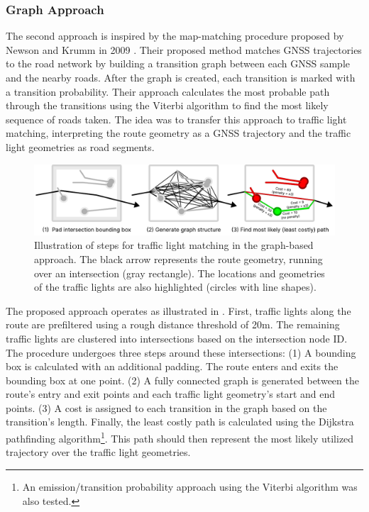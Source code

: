 \subsubsection{Graph Approach}

The second approach is inspired by the map-matching procedure proposed by Newson and Krumm in 2009 \cite{newson_hidden_2009}. Their proposed method matches GNSS trajectories to the road network by building a transition graph between each GNSS sample and the nearby roads. After the graph is created, each transition is marked with a transition probability. Their approach calculates the most probable path through the transitions using the Viterbi algorithm to find the most likely sequence of roads taken. The idea was to transfer this approach to traffic light matching, interpreting the route geometry as a GNSS trajectory and the traffic light geometries as road segments.

\begin{figure}[t]
\centering
\includegraphics[width=\linewidth]{images/sg-selection-graph-approach.pdf}
\caption{Illustration of steps for traffic light matching in the graph-based approach. The black arrow represents the route geometry, running over an intersection (gray rectangle). The locations and geometries of the traffic lights are also highlighted (circles with line shapes).}
\label{fig:sg-selection-graph-approach}
\end{figure}

The proposed approach operates as illustrated in . First, traffic lights along the route are prefiltered using a rough distance threshold of 20m. The remaining traffic lights are clustered into intersections based on the intersection node ID. The procedure undergoes three steps around these intersections: (1) A bounding box is calculated with an additional padding. The route enters and exits the bounding box at one point. (2) A fully connected graph is generated between the route's entry and exit points and each traffic light geometry's start and end points. (3) A cost is assigned to each transition in the graph based on the transition's length. Finally, the least costly path is calculated using the Dijkstra pathfinding algorithm\footnote{An emission/transition probability approach using the Viterbi algorithm was also tested.}. This path should then represent the most likely utilized trajectory over the traffic light geometries.

